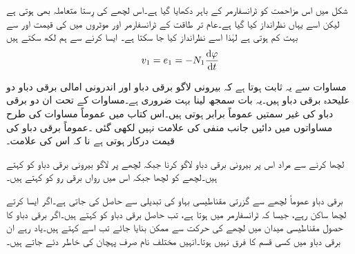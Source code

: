 شکل میں اس مزاحمت کو ٹرانسفارمر کے باہر دکھایا گیا ہے۔اس لچھے کی رِستا متعاملہ بھی ہوتی ہے لیکن اسے یہاں نظرانداز کیا گیا ہے۔عام تر طاقت کے ٹرانسفارمر اور موٹروں  میں  کی قیمت  اور  سے بہت کم ہوتی ہے لہٰذا اسے نظرانداز کیا جا سکتا ہے۔ ایسا کرنے سے ہم لکھ سکتے ہیں 
\begin{align}\label{مساوات_ٹرانسفارمر_بیرونی_اندرونی_دباو_تقریبا_برابر}
v_1 = e_1=-N_1 \frac{\dif \varphi}{\dif t}
\end{align}

مساوات  سے یہ ثابت ہوتا ہے کہ بیرونی لاگو برقی دباو  اور اندرونی امالی برقی دباو  دو علیحدہ برقی دباو ہیں۔یہ بات سمجھ لینا بہت ضروری ہے۔مساوات  کے تحت ان دو برقی دباو کی غیر سمتیں عموماً برابر ہوتی ہیں۔اس کتاب میں عموماً مساوات   کی طرح مساواتوں میں دائیں جانب منفی کی علامت نہیں لکھی گئی ۔عموماً برقی دباو کی قیمت درکار ہوتی ہے نا کہ اس کی علامت۔

لچھا  کرنے سے مراد اس پر بیرونی برقی دباو لاگو کرنا  جبکہ لچھے پر لاگو بیرونی برقی دباو کو   کہتے ہیں۔لچھے  کو  لچھا جبکہ اس میں رواں برقی رو کو  کہتے ہیں۔

برقی دباو عموماً لچھے سے گزرتی مقناطیسی بہاو کی تبدیلی سے حاصل کی جاتی ہے۔اگر ایسا کرتے لچھا ساکن رہے، جیسا کہ ٹرانسفارمر میں ہوتا ہے، تب حاصل برقی دباو کو   کہتے ہیں۔اگر برقی دباو کا حصول مقناطیسی میدان میں لچھے کی حرکت سے ممکن بنایا جائے تب اسے    کہتے ہیں۔یاد رہے ان برقی دباو میں کسی قسم کا فرق نہیں ہوتا۔انہیں مختلف نام صرف پہچان کی خاطر دئے جاتے ہیں۔

